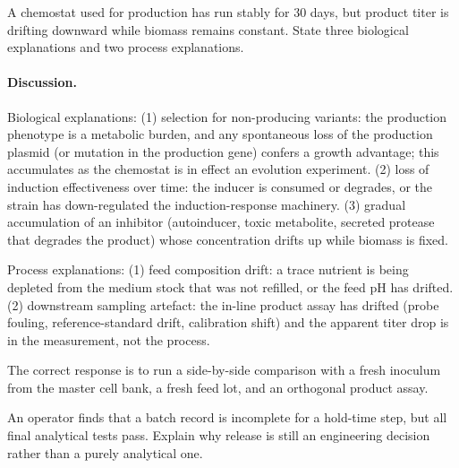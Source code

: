 \begin{exercise}
A chemostat used for production has run stably for 30 days, but product
titer is drifting downward while biomass remains constant. State three
biological explanations and two process explanations.
\end{exercise}

\paragraph{Discussion.}
Biological explanations:
(1) selection for non-producing variants: the production phenotype
is a metabolic burden, and any spontaneous loss of the production
plasmid (or mutation in the production gene) confers a growth
advantage; this accumulates as the chemostat is in effect an
evolution experiment.
(2) loss of induction effectiveness over time: the inducer is consumed
or degrades, or the strain has down-regulated the induction-response
machinery.
(3) gradual accumulation of an inhibitor (autoinducer, toxic
metabolite, secreted protease that degrades the product) whose
concentration drifts up while biomass is fixed.

Process explanations:
(1) feed composition drift: a trace nutrient is being depleted from
the medium stock that was not refilled, or the feed pH has drifted.
(2) downstream sampling artefact: the in-line product assay has
drifted (probe fouling, reference-standard drift, calibration shift)
and the apparent titer drop is in the measurement, not the process.

The correct response is to run a side-by-side comparison with a
fresh inoculum from the master cell bank, a fresh feed lot, and an
orthogonal product assay.

\begin{exercise}
An operator finds that a batch record is incomplete for a hold-time
step, but all final analytical tests pass. Explain why release is still
an engineering decision rather than a purely analytical one.
\end{exercise}

